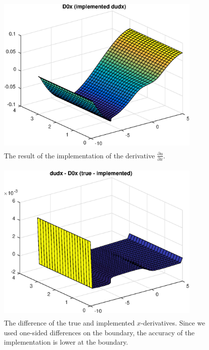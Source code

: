\documentclass[a4paper,10pt]{article}
\begin{document}
\begin{figure}[ht]
  \centering
  \includegraphics[width = 10cm, height = 8cm]{D0x}
  \begin{minipage}[t]{100mm}
    \caption{
      The result of the implementation of the derivative $\tfrac{\partial u}{\partial x}$.
    }\label{FIG_jjj}
  \end{minipage}
\end{figure}



\begin{figure}[ht]
  \centering
  \includegraphics[width = 10cm, height = 8cm]{dudxD0x}
  \begin{minipage}[t]{100mm}
    \caption{
      The difference of the true and implemented $x$-derivatives. Since we used
      one-sided differences on the boundary, the accuracy of the implementation is
      lower at the boundary. 
    }\label{FIG_jjj}
  \end{minipage}
\end{figure}
\end{document}
